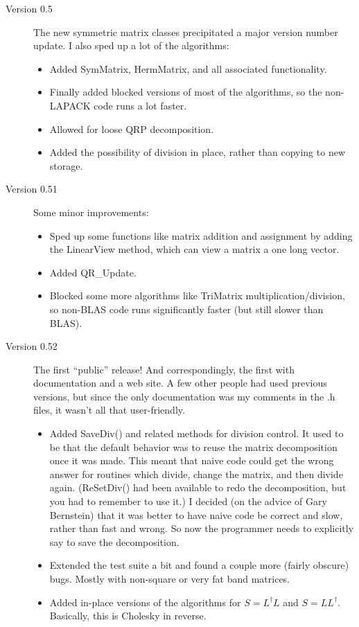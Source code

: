 \documentclass[twoside,letterpaper,11pt]{article}
\begin{document}
\begin{description}
\item[Version 0.5]
The new symmetric matrix classes precipitated a major version number update.
I also sped up a lot of the algorithms:
\begin{itemize}
\item
Added SymMatrix, HermMatrix, and all associated functionality.
\item
Finally added blocked versions of most of the algorithms, so the non-LAPACK
code runs a lot faster.
\item
Allowed for loose QRP decomposition.
\item
Added the possibility of division in place, rather than copying to new storage.
\end{itemize}

\item[Version 0.51]
Some minor improvements:
\begin{itemize}
\item
Sped up some functions like matrix addition and assignment by adding the 
LinearView method, which can view a matrix a one long vector.
\item
Added QR\_Update.
\item
Blocked some more algorithms like TriMatrix multiplication/division, so non-BLAS
code runs significantly faster (but still slower than BLAS).
\end{itemize}

\item[Version 0.52]
The first ``public'' release!  And correspondingly, the first with documentation
and a web site.  A few other people had used previous versions, but since the
only documentation was my comments in the .h files, it wasn't all that user-friendly.
\begin{itemize}
\item
Added SaveDiv() and related methods for division control.  It used to be that the 
default behavior was to reuse the matrix decomposition once it was made.  
This meant that naive code could get the wrong answer for routines which
divide, change the matrix, and then divide again.  (ReSetDiv() had been available
to redo the decomposition, but you had to remember to use it.)  I decided
(on the advice of Gary Bernstein) that it was better to have naive code 
be correct and slow, rather than fast and wrong.  So now the programmer needs 
to explicitly say to save the decomposition.
\item
Extended the test suite a bit and found a couple more (fairly obscure) bugs.
Mostly with non-square or very fat band matrices.
\item
Added in-place versions of the algorithms for $S = L^\dagger L$ and $S = L L^\dagger$.
Basically, this is Cholesky in reverse.
\end{itemize}


\end{description}
\end{document}
